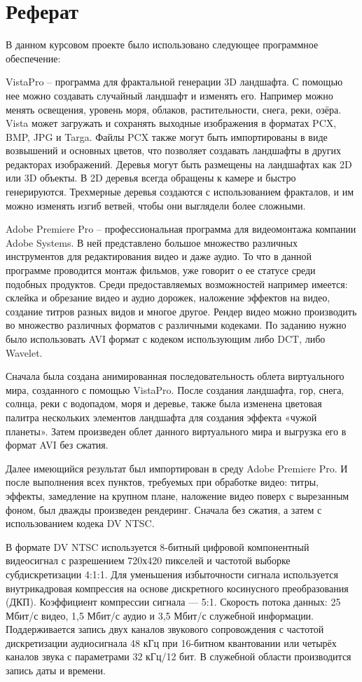 \section{Реферат}

В данном курсовом проекте было использовано следующее программное обеспечение:

VistaPro – программа для фрактальной генерации 3D ландшафта. С помощью нее можно создавать случайный ландшафт и изменять его. Например можно менять освещения, уровень моря, облаков, растительности, снега, реки, озёра. Vista может загружать и сохранять выходные изображения в форматах PCX, BMP, JPG и Targa. Файлы PCX также могут быть импортированы в виде возвышений и основных цветов, что позволяет создавать ландшафты в других редакторах изображений. Деревья могут быть размещены на ландшафтах как 2D или 3D объекты. В 2D деревья всегда обращены к камере и быстро генерируются. Трехмерные деревья создаются с использованием фракталов, и им можно изменять изгиб ветвей, чтобы они выглядели более сложными.

Adobe Premiere Pro – профессиональная программа для видеомонтажа компании Adobe Systems. В ней представлено большое множество различных инструментов для редактирования видео и даже аудио. То что в данной программе проводится монтаж фильмов, уже говорит о ее статусе среди подобных продуктов. Среди предоставляемых возможностей например имеется: склейка и обрезание видео и аудио дорожек, наложение эффектов на видео, создание титров разных видов и многое другое. Рендер видео можно производить во множество различных форматов с различными кодеками. По заданию нужно было использовать AVI формат с кодеком использующим либо DCT, либо Wavelet.

Сначала была создана анимированная последовательность облета виртуального мира, созданного с помощью VistaPro. После создания ландшафта, гор, снега, солнца, реки с водопадом, моря и деревье, также была изменена цветовая палитра нескольких элементов ландшафта для создания эффекта «чужой планеты». Затем произведен облет данного виртуального мира и выгрузка его в формат AVI без сжатия.

Далее имеющийся результат был импортирован в среду Adobe Premiere Pro. И после выполнения всех пунктов, требуемых при обработке видео: титры, эффекты, замедление на крупном плане, наложение видео поверх с вырезанным фоном, был дважды произведен рендеринг. Сначала без сжатия, а затем с использованием кодека DV NTSC.

В формате DV NTSC используется 8-битный цифровой компонентный видеосигнал с разрешением 720х420 пикселей и частотой выборке субдискретизации 4:1:1. Для уменьшения избыточности сигнала используется внутрикадровая компрессия на основе дискретного косинусного преобразования (ДКП). Коэффициент компрессии сигнала — 5:1. Скорость потока данных: 25 Мбит/с видео, 1,5 Мбит/с аудио и 3,5 Мбит/с служебной информации. Поддерживается запись двух каналов звукового сопровождения с частотой дискретизации аудиосигнала 48 кГц при 16-битном квантовании или четырёх каналов звука с параметрами 32 кГц/12 бит. В служебной области производится запись даты и времени.

